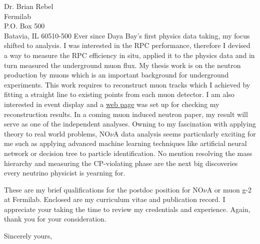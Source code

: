 \documentclass{letter} %
\begin{document}
\begin{letter}{Dr. Brian Rebel \\
Fermilab \\
P.O. Box 500 \\
Batavia, IL 60510-500}
Ever since Daya Bay's first physics data taking, my focus shifted to analysis. I was interested in the RPC performance, therefore I devised a way to measure the RPC efficiency in situ, applied it to the physics data and in turn measured the underground muon flux. My thesis work is on the neutron production by muons which is an important background for underground experiments. This work requires to reconstruct muon tracks which I achieved by fitting a straight line to existing points from each muon detector. I am also interested in event display and a \href{http://heplinux3.phys.uh.edu/~sklin/WebTryout/MuonViewer/v0-4-3-1/main.html}{web page} was set up for checking my reconstruction results. In a coming muon induced neutron paper, my result will serve as one of the independent analyses. Owning to my fascination with applying theory to real world problems, NO$\nu$A data analysis seems particularly exciting for me such as applying advanced machine learning techniques like artificial neural network or decision tree to particle identification. No mention resolving the mass hierarchy and measuring the CP-violating phase are the next big discoveries every neutrino physicist is yearning for.


\noindent %
These are my brief qualifications for the postdoc position for NO$\nu$A or muon g-2 at Fermilab. Enclosed are my curriculum vitae and publication record. I appreciate your taking the time to review my credentials and experience. Again, thank you for your consideration. 
 
\closing{Sincerely yours,} 
 

 

\end{letter}
 
\end{document}
